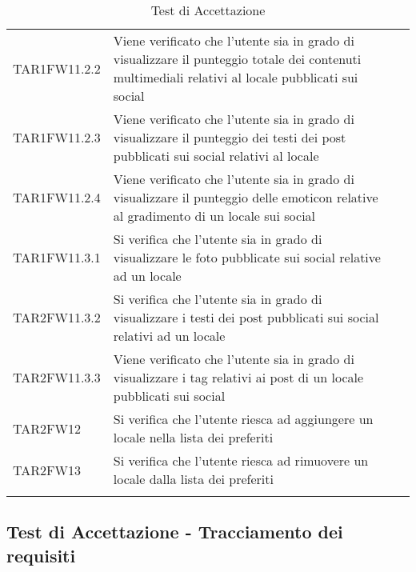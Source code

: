 \begin{longtable}{ m{}<{\centering}  m{}<{\centering}  m{}<{\centering} }
	TAR1FW11.2.2	& Viene verificato che l'utente sia in grado di visualizzare il punteggio totale dei contenuti multimediali relativi al locale pubblicati sui social & \Ni \\
	TAR1FW11.2.3	& Viene verificato che l'utente sia in grado di visualizzare il punteggio dei testi dei post pubblicati sui social relativi al locale & \Ni \\
	TAR1FW11.2.4	& Viene verificato che l'utente sia in grado di visualizzare il punteggio delle emoticon relative al gradimento di un locale sui social & \Ni \\
	TAR1FW11.3.1	& Si verifica che l'utente sia in grado di visualizzare le foto pubblicate sui social relative ad un locale & \Ni \\
	TAR2FW11.3.2	& Si verifica che l'utente sia in grado di visualizzare i testi dei post pubblicati sui social relativi ad un locale & \Ni \\
	TAR2FW11.3.3	& Viene verificato che l'utente sia in grado di visualizzare i tag relativi ai post di un locale pubblicati sui social & \Ni \\
	TAR2FW12 & Si verifica che l'utente riesca ad aggiungere un locale nella lista dei preferiti & \Ni \\
	TAR2FW13 & Si verifica che l'utente riesca ad rimuovere un locale dalla lista dei preferiti & \Ni \\
	
	\hiderowcolors \caption{Test di Accettazione}
\end{longtable}	

\subsection{Test di Accettazione - Tracciamento dei requisiti}

